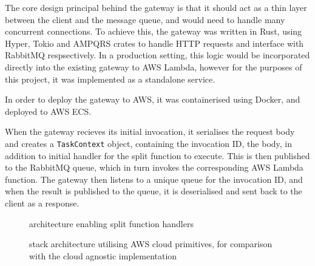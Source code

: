 The core design principal behind the gateway is that it should act as a thin layer between the client and the message queue, and would need to handle many concurrent connections. To achieve this, the gateway was written in Rust, using Hyper, Tokio and AMPQRS crates to handle HTTP requests and interface with RabbitMQ respsectively. In a production setting, this logic would be incorporated directly into the existing gateway to AWS Lambda, however for the purposes of this project, it was implemented as a standalone service.

In order to deploy the gateway to AWS, it was containerised using Docker, and deployed to AWS ECS.

When the gateway recieves its initial invocation, it serialises the request body and creates a \verb|TaskContext| object, containing the invocation ID, the body, in addition to initial handler for the split function to execute. This is then published to the RabbitMQ queue, which in turn invokes the corresponding AWS Lambda function. The gateway then listens to a unique queue for the invocation ID, and when the result is published to the queue, it is deserialised and sent back to the client as a response.

\begin{figure}[htp]
    \centering
    \quad
    \caption{\faas{} architecture enabling split function handlers}
\end{figure}

\begin{figure*}
    \centering
    \caption{\faaas{} stack architecture utilising AWS cloud primitives, for comparison with the cloud agnostic \faaastime{} implementation}
    \label{fig:faaas-arch}
\end{figure*}

